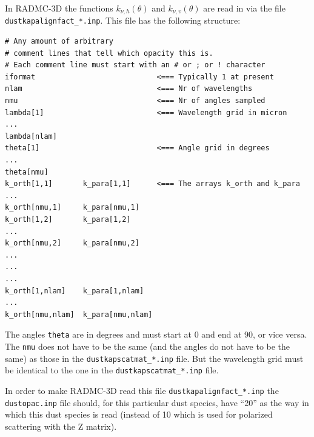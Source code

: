 \documentclass{report}
\begin{document}
In RADMC-3D the functions $k_{\nu,h}(\theta)$ and $k_{\nu,v}(\theta)$
are read in via the file {\small\tt dustkapalignfact\_*.inp}. This file
has the following structure:
{\small\begin{verbatim}
# Any amount of arbitrary
# comment lines that tell which opacity this is.
# Each comment line must start with an # or ; or ! character
iformat                            <=== Typically 1 at present
nlam                               <=== Nr of wavelengths
nmu                                <=== Nr of angles sampled
lambda[1]                          <=== Wavelength grid in micron
...                                           
lambda[nlam]                                  
theta[1]                           <=== Angle grid in degrees
...                                           
theta[nmu]                              
k_orth[1,1]       k_para[1,1]      <=== The arrays k_orth and k_para
...                                            
k_orth[nmu,1]     k_para[nmu,1]               
k_orth[1,2]       k_para[1,2]                 
...
k_orth[nmu,2]     k_para[nmu,2]
...
...
...
k_orth[1,nlam]    k_para[1,nlam]
...
k_orth[nmu,nlam]  k_para[nmu,nlam]
\end{verbatim}}
The angles {\small\tt theta} are in degrees and must start at 0 and end
at 90, or vice versa. 
The {\small\tt nmu} does not have to be the same (and the angles do
not have to be the same) as those in the {\small\tt dustkapscatmat\_*.inp}
file. But the wavelength grid must be identical to the one in 
the {\small\tt dustkapscatmat\_*.inp} file.

In order to make RADMC-3D read this file {\small\tt dustkapalignfact\_*.inp}
the {\small\tt dustopac.inp} file should, for this particular dust species,
have ``20'' as the way in which this dust species is read (instead of 10
which is used for polarized scattering with the Z matrix).
\end{document}

